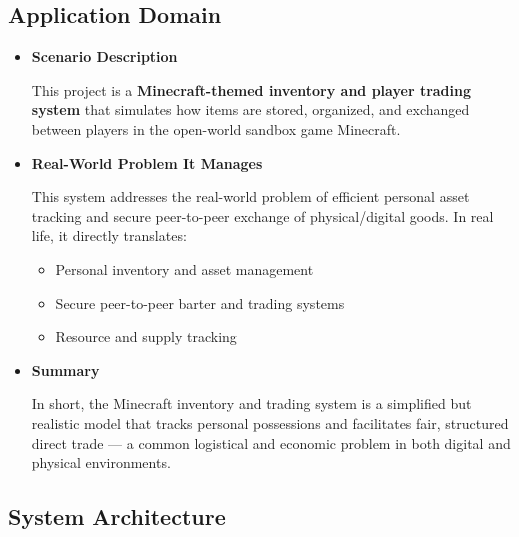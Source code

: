 \documentclass[11pt,a4paper]{article}
\begin{document}
\subsection{Application Domain}

\begin{itemize}
    \item \textbf{Scenario Description}

    This project is a \textbf{Minecraft-themed inventory and player trading system} that simulates how items are stored, organized, and exchanged between players in the open-world sandbox game Minecraft.

    \item \textbf{Real-World Problem It Manages}

    This system addresses the real-world problem of efficient personal asset tracking and secure peer-to-peer exchange of physical/digital goods. In real life, it directly translates:

    \begin{itemize}
        \item Personal inventory and asset management

        \item Secure peer-to-peer barter and trading systems

        \item Resource and supply tracking

    \end{itemize}

    \item \textbf{Summary}

    In short, the Minecraft inventory and trading system is a simplified but realistic model that tracks personal possessions and facilitates fair, structured direct trade — a common logistical and economic problem in both digital and physical environments.

\end{itemize}

\subsection{System Architecture}
\end{document}
